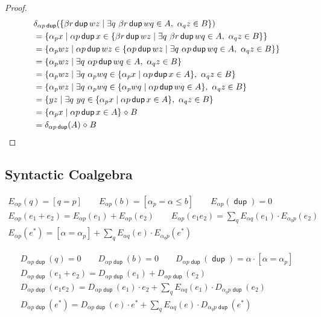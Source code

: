 \documentclass{article}
\renewcommand\smash{\mathrel{\diamond}}
\newcommand\ssum{\mathop{\textstyle\sum}}
\newcommand\pdup{\mathop{\mathsf{dup}}}
\newcommand\bval[1]{[#1]}
\renewcommand\star{^{\textstyle *}}
\begin{document}
\begin{proof}
\begin{align*}
& \delta_{\alpha p\pdup}(\set{\beta r\pdup wz}{\exists q\ \beta r\pdup wq\in A,\ \alpha_qz\in B})\\
&= \set{\alpha_p x}{\alpha p\pdup x\in\set{\beta r\pdup wz}{\exists q\ \beta r\pdup wq\in A,\ \alpha_qz\in B}}\\
&= \set{\alpha_p wz}{\alpha p\pdup wz\in\set{\alpha p\pdup wz}{\exists q\ \alpha p\pdup wq\in A,\ \alpha_qz\in B}}\\
&= \set{\alpha_p wz}{\exists q\ \alpha p\pdup wq\in A,\ \alpha_qz\in B}\\
&= \set{\alpha_p wz}{\exists q\ \alpha_p wq\in\set{\alpha_p x}{\alpha p\pdup x\in A},\ \alpha_qz\in B}\\
&= \set{\alpha_p wz}{\exists q\ \alpha_p wq\in\set{\alpha_p wq}{\alpha p\pdup wq\in A},\ \alpha_qz\in B}\\
&= \set{yz}{\exists q\ yq\in\set{\alpha_p x}{\alpha p\pdup x\in A},\ \alpha_qz\in B}\\
&= \set{\alpha_p x}{\alpha p\pdup x\in A}\smash B\\
&= \delta_{\alpha p\pdup}(A)\smash B
\end{align*}
\end{proof}

\subsection*{Syntactic Coalgebra}

\begin{gather*}
E_{\alpha p}(q) = \bval{q = p} \qquad
E_{\alpha p}(b) = \bval{\alpha_p=\alpha\leq b} \qquad
E_{\alpha p}(\pdup) = 0\\
E_{\alpha p}(e_1+e_2) = E_{\alpha p}(e_1)+E_{\alpha p}(e_2) \qquad
E_{\alpha p}(e_1e_2) = \ssum_{q} E_{\alpha q}(e_1)\cdot E_{\alpha_q p}(e_2)\\
E_{\alpha p}(e\star) = \bval{\alpha=\alpha_p} + \ssum_{q} E_{\alpha q}(e)\cdot E_{\alpha_q p}(e\star)
\end{gather*}

\begin{gather*}
D_{\alpha p\pdup}(q) = 0 \qquad
D_{\alpha p\pdup}(b) = 0 \qquad
D_{\alpha p\pdup}(\pdup) = \alpha\cdot\bval{\alpha=\alpha_p}\\
D_{\alpha p\pdup}(e_1+e_2) = D_{\alpha p\pdup}(e_1)+D_{\alpha p\pdup}(e_2)\\
D_{\alpha p\pdup}(e_1e_2) = D_{\alpha p\pdup}(e_1)\cdot e_2 + \ssum_{q} E_{\alpha q}(e_1)\cdot D_{\alpha_qp\pdup}(e_2)\\
D_{\alpha p\pdup}(e\star) = D_{\alpha p\pdup}(e)\cdot e\star + \ssum_{q} E_{\alpha q}(e)\cdot D_{\alpha_qp\pdup}(e\star)
\end{gather*}
\end{document}
